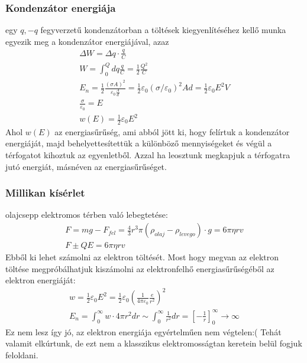 \documentclass{article}
\begin{document}
\subsubsection{Kondenzátor energiája}
egy $q, -q$ fegyverzetű kondenzátorban a töltések kiegyenlítéséhez kellő munka egyezik meg a kondenzátor energiájával, azaz
\begin{gather*}
\Delta W = \Delta q \cdot \frac{q}{C} \\
W=\int_0^Q dq \frac{q}{C} = \frac{1}{2} \frac{Q^2}{C} \\
E_n = \frac{1}{2} \frac{(\sigma A)^2}{\varepsilon_0 \frac{A}{d}} = \frac{1}{2} \varepsilon_0 (\sigma/\varepsilon_0)^2 Ad=\frac{1}{2} \varepsilon_0 E^2 V \\
\frac{\sigma}{\varepsilon_0} = E \\
w(E)=\frac{1}{2}\varepsilon_0 E^2
\end{gather*}
Ahol $w(E)$ az energiasűrűség, ami abból jött ki, hogy felírtuk a kondenzátor energiáját, majd behelyettesítettük a különböző mennyiségeket és végül a térfogatot kihoztuk az egyenletből. Azzal ha leosztunk megkapjuk a térfogatra jutó energiát, másnéven az energiasűrűséget.
\subsubsection{Millikan kísérlet}
olajcsepp elektromos térben való lebegtetése:
\begin{gather*}
F=mg-F_{fel} = \frac{4}{3} r^3\pi (\rho_{olaj}-\rho_{levego})\cdot g=6\pi\eta r v \\
F \pm QE = 6\pi\eta r v
\end{gather*} 
Ebből ki lehet számolni az elektron töltését. Most hogy megvan az elektron töltése megpróbálhatjuk kiszámolni az elektronfelhő energiasűrűségéből az elektron energiáját:
\begin{gather*}
w=\frac{1}{2} \varepsilon_0 E^2 = \frac{1}{2} \varepsilon_0 \left( \frac{1}{4\pi \varepsilon_0} \frac{e}{r^2}\right)^2 \\
E_n = \int_0^{\infty} w \cdot 4\pi r^2 dr \sim \int_0^{\infty} \frac{1}{r^2} dr = \left[ -\frac{1}{r}\right]_0^{\infty} \rightarrow \infty
\end{gather*}
Ez nem lesz így jó, az elektron energiája egyértelműen nem végtelen:( Tehát valamit elkúrtunk, de ezt nem a klasszikus elektromosságtan keretein belül fogjuk feloldani.
\end{document}
